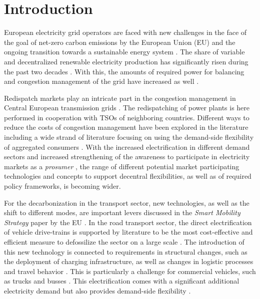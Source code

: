 \documentclass[final,10pt]{elsarticle}
\begin{document}
\linenumbers  %
\begin{acronym}

\end{acronym}
\section{Introduction} \label{ref:intro}

    European electricity grid operators are faced with new challenges in the face of the goal of net-zero carbon emissions by the European Union (EU) and the ongoing transition towards a sustainable energy system \cite{european_green_deal, CARLINI201974}. The share of variable and decentralized renewable electricity production has significantly risen during the past two decades \cite{iea_world_energy_statistics}. With this, the amounts of required power for balancing and congestion management of the grid have increased as well \cite{acer_2024_mmr}. 

    Redispatch markets play an intricate part in the congestion management in Central European transmission grids \cite{9221963}. The redispatching of power plants is here performed in cooperation with \aclp{TSO} of neighboring countries. Different ways to reduce the costs of congestion management have been explored in the literature \cite{PILLAY201583} including a wide strand of literature focusing on using the demand-side flexibility of aggregated consumers \cite{GORANSSON2014860}. With the increased electrification in different demand sectors \cite{iea_world_energy_statistics} and increased strengthening of the awareness to participate in electricity markets as a \textit{prosumer} \cite{frieden2020collective}, the range of different potential market participating technologies and concepts to support decentral flexibilities, as well as of required policy frameworks, is becoming wider.

    For the decarbonization in the transport sector, new technologies, as well as the shift to different modes, are important levers discussed in the \textit{Smart Mobility Strategy} paper by the EU \cite{eu_mobility_strategy}. In the road transport sector, the direct electrification of vehicle drive-trains is supported by literature to be the most cost-effective and efficient measure to defossilize the sector on a large scale \cite{Auer2020, Plötz2022}. The introduction of this new technology is connected to requirements in structural changes, such as the deployment of charging infrastructure, as well as changes in logistic processes and travel behavior \cite{LEBROUHI2021103273}. This is particularly a challenge for commercial vehicles, such as trucks and busses \cite{KONSTANTINOU2023100746}. This electrification comes with a significant additional electricity demand but also provides demand-side flexibility \cite{ag2022flexibility}. 
    
\end{document}
